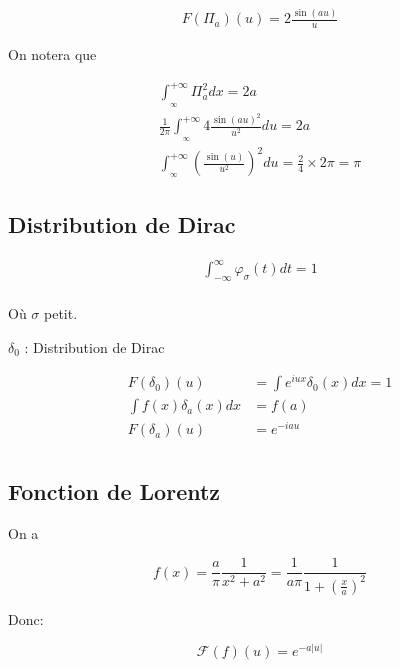\documentclass[a4paper,11pt]{article}
\begin{document}
\begin{align*}
  F(\Pi_a)(u) = 2 \frac{\sin(au)}{u}
\end{align*}

On notera que

\begin{align*}
  \int^{+\infty}_{_\infty} \Pi_a^2 dx = 2a \\
  \frac{1}{2\pi} \int^{+\infty}_{_\infty} 4 \frac{\sin(au)^2}{u^2} du = 2a \\
  \int^{+\infty}_{_\infty} \left( \frac{\sin(u)}{u^2} \right) ^2 du = \frac{2}{4} \times 2 \pi = \pi
\end{align*}

\subsection{Distribution de Dirac}
\begin{align*}
  \int_{-\infty}^{\infty} \varphi_\sigma(t)dt = 1\\
\end{align*}

Où $\sigma$ petit.

$\delta_0 $ : Distribution de Dirac

\begin{align*}
  F(\delta_0)(u) &= \int e^{iux} \delta_0(x)dx = 1\\
  \int f(x)\delta_a(x)dx &= f(a)\\
  F(\delta_a)(u) &= e^{-iau}\\
\end{align*}

\subsection{Fonction de Lorentz}

On a

$$ f(x) = \frac{a}{\pi} \frac{1}{x^2 + a^2} = \frac{1}{a \pi} \frac{1}{1 + \left(\frac{x}{a} \right) ^2 }$$

Donc:

$$ \mathcal{F}(f)(u) = e^{-a|u|} $$
\end{document}
